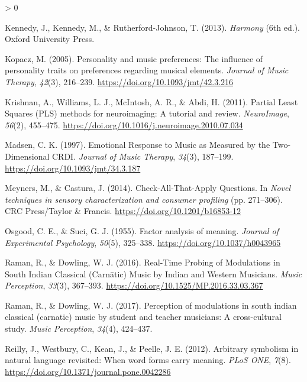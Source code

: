 \documentclass[
  english,
  man,floatsintext]{apa6}
\newlength{\cslhangindent}
\newenvironment{CSLReferences}[2] %
 {%
  \setlength{\parindent}{0pt}
  \ifodd #1 \everypar{\setlength{\hangindent}{\cslhangindent}}\ignorespaces\fi
  \ifnum #2 > 0
  \setlength{\parskip}{#2\baselineskip}
  \fi
 }%
 {}
\begin{document}
\begin{CSLReferences}{1}{0}
\leavevmode\hypertarget{ref-Kennedy2013}{}%
Kennedy, J., Kennedy, M., \& Rutherford-Johnson, T. (2013). \emph{Harmony} (6th ed.). Oxford University Press.

\leavevmode\hypertarget{ref-Kopacz2005}{}%
Kopacz, M. (2005). {Personality and music preferences: The influence of personality traits on preferences regarding musical elements}. \emph{Journal of Music Therapy}, \emph{42}(3), 216--239. \url{https://doi.org/10.1093/jmt/42.3.216}

\leavevmode\hypertarget{ref-Krishnan2011}{}%
Krishnan, A., Williams, L. J., McIntosh, A. R., \& Abdi, H. (2011). {Partial Least Squares (PLS) methods for neuroimaging: A tutorial and review}. \emph{NeuroImage}, \emph{56}(2), 455--475. \url{https://doi.org/10.1016/j.neuroimage.2010.07.034}

\leavevmode\hypertarget{ref-Madsen1997}{}%
Madsen, C. K. (1997). {Emotional Response to Music as Measured by the Two-Dimensional CRDI}. \emph{Journal of Music Therapy}, \emph{34}(3), 187--199. \url{https://doi.org/10.1093/jmt/34.3.187}

\leavevmode\hypertarget{ref-Meyners2014}{}%
Meyners, M., \& Castura, J. (2014). {Check-All-That-Apply Questions}. In \emph{Novel techniques in sensory characterization and consumer profiling} (pp. 271--306). CRC Press/Taylor {\&} Francis. \url{https://doi.org/10.1201/b16853-12}

\leavevmode\hypertarget{ref-Osgood1955}{}%
Osgood, C. E., \& Suci, G. J. (1955). {Factor analysis of meaning}. \emph{Journal of Experimental Psychology}, \emph{50}(5), 325--338. \url{https://doi.org/10.1037/h0043965}

\leavevmode\hypertarget{ref-Raman2016}{}%
Raman, R., \& Dowling, W. J. (2016). {Real-Time Probing of Modulations in South Indian Classical (Carnātic) Music by Indian and Western Musicians}. \emph{Music Perception}, \emph{33}(3), 367--393. \url{https://doi.org/10.1525/MP.2016.33.03.367}

\leavevmode\hypertarget{ref-Raman2017}{}%
Raman, R., \& Dowling, W. J. (2017). {Perception of modulations in south indian classical (carnatic) music by student and teacher musicians: A cross-cultural study}. \emph{Music Perception}, \emph{34}(4), 424--437.

\leavevmode\hypertarget{ref-Reilly2012}{}%
Reilly, J., Westbury, C., Kean, J., \& Peelle, J. E. (2012). {Arbitrary symbolism in natural language revisited: When word forms carry meaning}. \emph{PLoS ONE}, \emph{7}(8). \url{https://doi.org/10.1371/journal.pone.0042286}


\end{CSLReferences}
\end{document}
